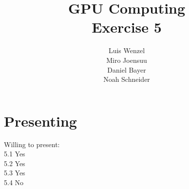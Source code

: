 \documentclass[12pt,twoside,a4paper]{article}
\title{GPU Computing\\
Exercise 5}
\author{
  Luis Wenzel\\
  Miro Joensuu\\
  Daniel Bayer\\
  Noah Schneider
}
\date{}
\begin{document}
\maketitle

\section{Presenting}
Willing to present:\\
5.1 Yes\\
5.2 Yes\\
5.3 Yes\\
5.4 No\\


	


\FloatBarrier

\FloatBarrier
\end{document}

